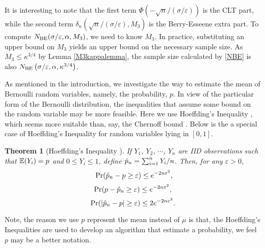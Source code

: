\documentclass{iitthesis}
\newtheorem{theorem}{Theorem}[section]
\theoremstyle{definition}
\begin{document}
It is interesting to note that the first term $\Phi\left(-\sqrt{n}/(\sigma /\varepsilon) \right)$ is the CLT part, while the second term $\delta_n\left(\sqrt{n}/(\sigma /\varepsilon),M_3\right)$ is the Berry-Esseene extra part. To compute $N_{\text{BE}}(\sigma /\varepsilon,\alpha,M_3)$, we need to know $M_3$. In practice, substituting an upper bound on $M_3$ yields an upper bound on the necessary sample size.
As $M_3 \leq \kappa^{3/4}$ by Lemma \ref{M3kappalemma}, the sample size calculated by \eqref{NBE} is also $N_{\text{BE}}\left(\sigma /\varepsilon,\alpha,\kappa^{3/4}\right) $.


As mentioned in the introduction, we investigate the way to estimate the mean of Bernoulli random variables, namely, the probability, $p$. In view of the particular form of the Bernoulli distribution, the inequalities that assume some bound on the random variable may be more feasible.  Here we use Hoeffding's Inequality \cite{H63}, which seems more suitable than, say, the Chernoff bound \cite{Chernoff52}.  Below is the a special case of Hoeffding's Inequality for random variables lying in $[0,1]$.
\begin{theorem}[Hoeffding's Inequality {\cite{H63}}] \label{hoeff}
If $Y_1$, $Y_2$, $\cdots$, $Y_n$ are IID observations such that $\mathbb{E}(Y_i)=p$ and $0 \leq Y_i \leq 1$, define $\hat{p}_n=\sum_{i=1}^n Y_i/n$. Then, for any $\varepsilon>0$, 
\begin{equation}\label{ineq:HoeffonesideB}\
\Pr(\hat{p}_n-p \geq \varepsilon) \leq e^{-2n\varepsilon^2},
\end{equation}
\begin{equation}\label{ineq:HoeffonesideA}
\Pr(p-\hat{p}_n \geq \varepsilon) \leq e^{-2n\varepsilon^2},
\end{equation}
\begin{equation}\label{ineq:Hoefftwoside}
\Pr(\left \lvert \hat{p}_n-p \right \rvert \geq \varepsilon) \leq 2e^{-2n\varepsilon^2}.
\end{equation}
\end{theorem}
 Note, the reason we use $p$ represent the mean instead of $\mu$ is that, the Hoeffding's Inequalities are used to develop an algorithm that estimate a probability, we feel $p$ may be a better notation.
 
\end{document}
